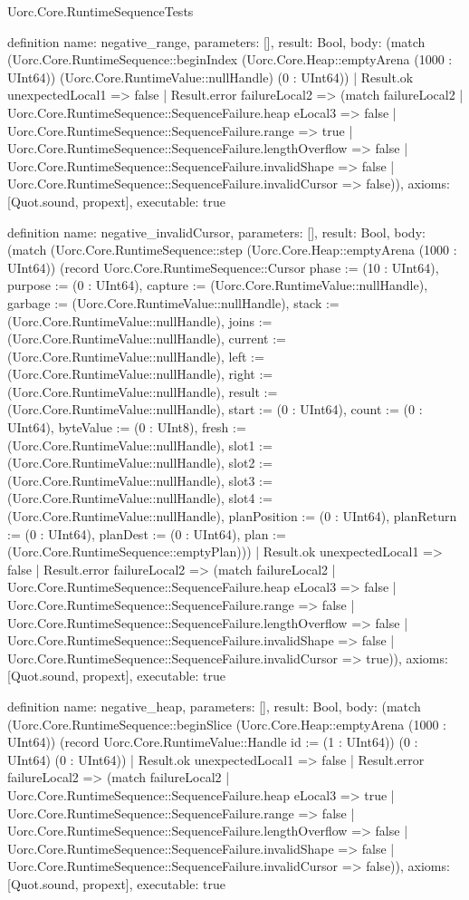 \begin{lexlean}{Uorc.Core.RuntimeSequenceTests}
\begin{semanticmodule}
definition{
  name: negative_range,
  parameters: [],
  result: Bool,
  body: (match (Uorc.Core.RuntimeSequence::beginIndex (Uorc.Core.Heap::emptyArena (1000 : UInt64)) (Uorc.Core.RuntimeValue::nullHandle) (0 : UInt64))
    | Result.ok unexpectedLocal1 => false
    | Result.error failureLocal2 => (match failureLocal2
      | Uorc.Core.RuntimeSequence::SequenceFailure.heap eLocal3 => false
      | Uorc.Core.RuntimeSequence::SequenceFailure.range => true
      | Uorc.Core.RuntimeSequence::SequenceFailure.lengthOverflow => false
      | Uorc.Core.RuntimeSequence::SequenceFailure.invalidShape => false
      | Uorc.Core.RuntimeSequence::SequenceFailure.invalidCursor => false)),
  axioms: [Quot.sound, propext],
  executable: true
}

definition{
  name: negative_invalidCursor,
  parameters: [],
  result: Bool,
  body: (match (Uorc.Core.RuntimeSequence::step (Uorc.Core.Heap::emptyArena (1000 : UInt64)) (record Uorc.Core.RuntimeSequence::Cursor {phase := (10 : UInt64), purpose := (0 : UInt64), capture := (Uorc.Core.RuntimeValue::nullHandle), garbage := (Uorc.Core.RuntimeValue::nullHandle), stack := (Uorc.Core.RuntimeValue::nullHandle), joins := (Uorc.Core.RuntimeValue::nullHandle), current := (Uorc.Core.RuntimeValue::nullHandle), left := (Uorc.Core.RuntimeValue::nullHandle), right := (Uorc.Core.RuntimeValue::nullHandle), result := (Uorc.Core.RuntimeValue::nullHandle), start := (0 : UInt64), count := (0 : UInt64), byteValue := (0 : UInt8), fresh := (Uorc.Core.RuntimeValue::nullHandle), slot1 := (Uorc.Core.RuntimeValue::nullHandle), slot2 := (Uorc.Core.RuntimeValue::nullHandle), slot3 := (Uorc.Core.RuntimeValue::nullHandle), slot4 := (Uorc.Core.RuntimeValue::nullHandle), planPosition := (0 : UInt64), planReturn := (0 : UInt64), planDest := (0 : UInt64), plan := (Uorc.Core.RuntimeSequence::emptyPlan)}))
    | Result.ok unexpectedLocal1 => false
    | Result.error failureLocal2 => (match failureLocal2
      | Uorc.Core.RuntimeSequence::SequenceFailure.heap eLocal3 => false
      | Uorc.Core.RuntimeSequence::SequenceFailure.range => false
      | Uorc.Core.RuntimeSequence::SequenceFailure.lengthOverflow => false
      | Uorc.Core.RuntimeSequence::SequenceFailure.invalidShape => false
      | Uorc.Core.RuntimeSequence::SequenceFailure.invalidCursor => true)),
  axioms: [Quot.sound, propext],
  executable: true
}

definition{
  name: negative_heap,
  parameters: [],
  result: Bool,
  body: (match (Uorc.Core.RuntimeSequence::beginSlice (Uorc.Core.Heap::emptyArena (1000 : UInt64)) (record Uorc.Core.RuntimeValue::Handle {id := (1 : UInt64)}) (0 : UInt64) (0 : UInt64))
    | Result.ok unexpectedLocal1 => false
    | Result.error failureLocal2 => (match failureLocal2
      | Uorc.Core.RuntimeSequence::SequenceFailure.heap eLocal3 => true
      | Uorc.Core.RuntimeSequence::SequenceFailure.range => false
      | Uorc.Core.RuntimeSequence::SequenceFailure.lengthOverflow => false
      | Uorc.Core.RuntimeSequence::SequenceFailure.invalidShape => false
      | Uorc.Core.RuntimeSequence::SequenceFailure.invalidCursor => false)),
  axioms: [Quot.sound, propext],
  executable: true
}


\end{semanticmodule}
\end{lexlean}
